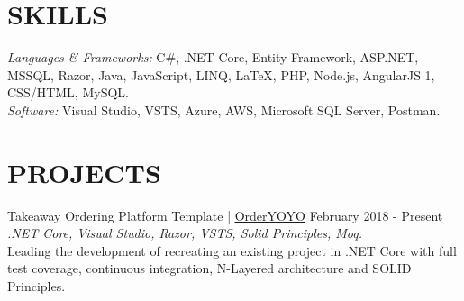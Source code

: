 \documentclass[margin, 10pt, hidelinks]{res} %
\newcommand{\tab}{\hspace*{1em}} %
\begin{document}
\begin{resume}


\section{SKILLS}

{\sl\large Languages \& Frameworks:}
C\#, .NET Core, Entity Framework, ASP.NET, MSSQL, Razor, Java, JavaScript, LINQ, LaTeX,
{\color{black!70}PHP, Node.js, AngularJS 1, CSS/HTML, MySQL.} \\
{\sl\large  Software:} Visual Studio, VSTS, Azure, AWS, Microsoft SQL Server, Postman.
\section{PROJECTS}

Takeaway Ordering Platform Template | \href{https://orderyoyo.com/}{\underline{OrderYOYO}} \hfill February 2018  - Present\\
{\it .NET Core, Visual Studio, Razor, VSTS, Solid Principles, Moq.} \\
\tab Leading the development of recreating an existing project in .NET Core with full test coverage, continuous integration, N-Layered architecture and SOLID Principles.


\end{resume}
\end{document}
